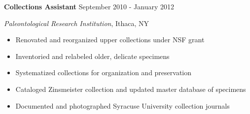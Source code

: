 
\vspace{7pt}

\textbf{Collections Assistant} \hfill September 2010 - January 2012

\textit{Paleontological Research Institution}, Ithaca, NY

\begin{itemize}
    \item Renovated and reorganized upper collections under NSF grant
    \item Inventoried and relabeled older, delicate specimens
    \item Systematized collections for organization and preservation
    \item Cataloged Zinsmeister collection and updated master database of specimens
    \item Documented and photographed Syracuse University collection journals
\end{itemize}
